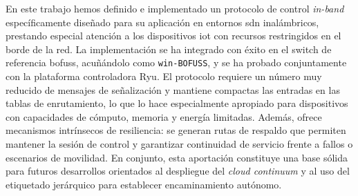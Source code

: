 En este trabajo hemos definido e implementado un protocolo de control \textit{in-band} específicamente diseñado para su aplicación en entornos \gls{sdn} inalámbricos, prestando especial atención a los dispositivos \gls{iot} con recursos restringidos en el borde de la red. La implementación se ha integrado con éxito en el switch de referencia \gls{bofuss}, acuñándolo como \texttt{win-BOFUSS}, y se ha probado conjuntamente con la plataforma controladora Ryu. El protocolo requiere un número muy reducido de mensajes de señalización y mantiene compactas las entradas en las tablas de enrutamiento, lo que lo hace especialmente apropiado para dispositivos con capacidades de cómputo, memoria y energía limitadas. Además, ofrece mecanismos intrínsecos de resiliencia: se generan rutas de respaldo que permiten mantener la sesión de control y garantizar continuidad de servicio frente a fallos o escenarios de movilidad. En conjunto, esta aportación constituye una base sólida para futuros desarrollos orientados al despliegue del \textit{cloud continuum} y al uso del etiquetado jerárquico para establecer encaminamiento autónomo.